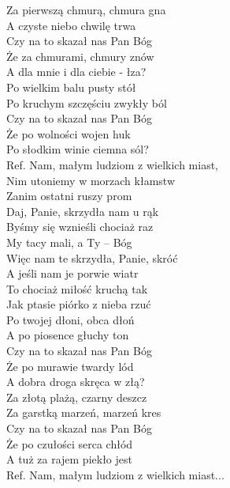 
\begin{flushleft}
Za pierwszą chmurą, chmura gna    \\
A czyste niebo chwilę trwa  \tab{} \\
Czy na to skazał nas Pan Bóg   \tab{} \\
Że za chmurami, chmury znów \tab{}  \\
A dla mnie i dla ciebie - łza?  \tab{} \\
\vskip 3mm
Po wielkim balu pusty stół   \\
Po kruchym szczęściu zwykły ból   \\
Czy na to skazał nas Pan Bóg     \\
Że po wolności wojen huk       \\
Po słodkim winie ciemna sól?      \\
\vskip 3mm
Ref. Nam, małym ludziom z wielkich miast,  \\
\hspace{0.9cm}Nim utoniemy w morzach kłamstw    \\
\hspace{0.9cm}Zanim ostatni ruszy prom    \\
\hspace{0.9cm}Daj, Panie, skrzydła nam u rąk        \\
\hspace{0.9cm}Byśmy się wznieśli chociaż raz  \\
\hspace{0.9cm}My tacy mali, a Ty – Bóg \\
\hspace{0.9cm}Więc nam te skrzydła, Panie, skróć \\
\hspace{0.9cm}A jeśli nam je porwie wiatr \\
\hspace{0.9cm}To chociaż miłość kruchą tak \\
\hspace{0.9cm}Jak ptasie piórko z nieba rzuć \\
\vskip 3mm
Po twojej dłoni, obca dłoń \\
A po piosence głuchy ton \\
Czy na to skazał nas Pan Bóg \\
Że po murawie twardy lód \\
A dobra droga skręca w złą? \\
\vskip 3mm
Za złotą plażą, czarny deszcz \\
Za garstką marzeń, marzeń kres \\
Czy na to skazał nas Pan Bóg \\
Że po czułości serca chłód \\
A tuż za rajem piekło jest \\
\vskip 3mm
Ref. Nam, małym ludziom z wielkich miast...
\end{flushleft}
\clearpage
